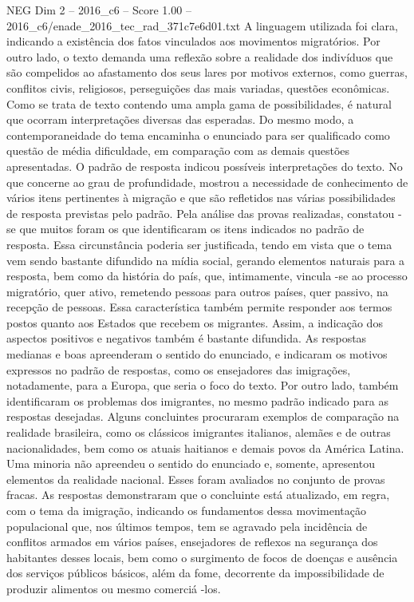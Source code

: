 \begin{textsample}{NEG Dim 2 – 2016\_c6 – Score 1.00 – 2016\_c6/enade\_2016\_tec\_rad\_371c7e6d01.txt}
A linguagem utilizada foi clara, indicando a existência dos fatos vinculados aos movimentos migratórios.
Por outro lado, o texto demanda uma reflexão sobre a realidade dos indivíduos que são compelidos ao afastamento dos seus lares por motivos externos, como guerras, conflitos civis, religiosos, perseguições das mais variadas, questões econômicas.
Como se trata de texto contendo uma ampla gama de possibilidades, é natural que ocorram interpretações diversas das esperadas.
Do mesmo modo, a contemporaneidade do tema encaminha o enunciado para ser qualificado como questão de média dificuldade, em comparação com as demais questões apresentadas.
O padrão de resposta indicou possíveis interpretações do texto.
No que concerne ao grau de profundidade, mostrou a necessidade de conhecimento de vários itens pertinentes à migração e que são refletidos nas várias possibilidades de resposta previstas pelo padrão.
Pela análise das provas realizadas, constatou -se que muitos foram os que identificaram os itens indicados no padrão de resposta.
Essa circunstância poderia ser justificada, tendo em vista que o tema vem sendo bastante difundido na mídia social, gerando elementos naturais para a resposta, bem como da história do país, que, intimamente, vincula -se ao processo migratório, quer ativo, remetendo pessoas para outros países, quer passivo, na recepção de pessoas.
Essa característica também permite responder aos termos postos quanto aos Estados que recebem os migrantes.
Assim, a indicação dos aspectos positivos e negativos também é bastante difundida.
As respostas medianas e boas apreenderam o sentido do enunciado, e indicaram os motivos expressos no padrão de respostas, como os ensejadores das imigrações, notadamente, para a Europa, que seria o foco do texto.
Por outro lado, também identificaram os problemas dos imigrantes, no mesmo padrão indicado para as respostas desejadas.
Alguns concluintes procuraram exemplos de comparação na realidade brasileira, como os clássicos imigrantes italianos, alemães e de outras nacionalidades, bem como os atuais haitianos e demais povos da América Latina.
Uma minoria não apreendeu o sentido do enunciado e, somente, apresentou elementos da realidade nacional.
Esses foram avaliados no conjunto de provas fracas.
As respostas demonstraram que o concluinte está atualizado, em regra, com o tema da imigração, indicando os fundamentos dessa movimentação populacional que, nos últimos tempos, tem se agravado pela incidência de conflitos armados em vários países, ensejadores de reflexos na segurança dos habitantes desses locais, bem como o surgimento de focos de doenças e ausência dos serviços públicos básicos, além da fome, decorrente da impossibilidade de produzir alimentos ou mesmo comerciá -los.

\end{textsample}
